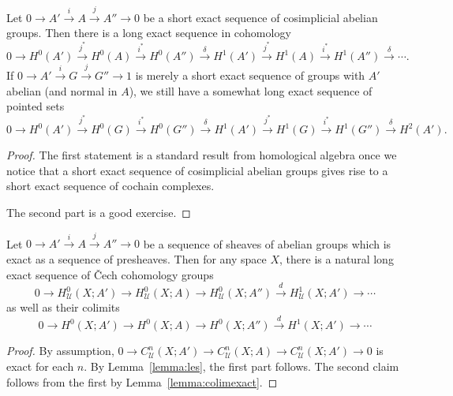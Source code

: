 \documentclass[a4paper,openany]{scrbook}
\begin{document}
\begin{lemma}\label{lemma:les}
Let $0 \to A' \xrightarrow{i} A \xrightarrow{j} A'' \to 0$ be a short exact sequence of cosimplicial abelian groups. Then there is a long exact sequence in cohomology
\[
0 \to H^0(A') \xrightarrow{j^*} H^0(A) \xrightarrow{i^*} H^0(A'') \xrightarrow{\delta} H^1(A') \xrightarrow{j^*} H^1(A) \xrightarrow{i^*} H^1(A'') \xrightarrow{\delta} \cdots.
\]
If $0 \to A' \xrightarrow{i} G \xrightarrow{j} G'' \to 1$ is merely a short exact sequence of groups with $A'$ abelian (and normal in $A$), we still have a somewhat long exact sequence of pointed sets
\[
0 \to H^0(A') \xrightarrow{j^*} H^0(G) \xrightarrow{i^*} H^0(G'') \xrightarrow{\delta} H^1(A') \xrightarrow{j^*} H^1(G) \xrightarrow{i^*} H^1(G'') \xrightarrow{\delta} H^2(A').
\]
\end{lemma}
\begin{proof}
The first statement is a standard result from homological algebra once we notice that a short exact sequence of cosimplicial abelian groups gives rise to a short exact sequence of cochain complexes.

The second part is a good exercise.
\end{proof}

\begin{corollary} \label{cor:lesfromsesofsheaves}
Let $0 \to A' \xrightarrow{i} A \xrightarrow{j} A'' \to 0$ be a sequence of sheaves of abelian groups which is exact as a sequence of presheaves. 
Then for any space $X$, there is a natural long exact sequence of Čech cohomology groups
\[
0 \to H^0_{\mathcal U}(X;A') \to H^0_{\mathcal U}(X;A) \to H^0_{\mathcal U}(X;A'') \xrightarrow{d} H^1_{\mathcal U}(X;A') \to \cdots
\]
as well as their colimits
\[
0 \to H^0(X;A') \to H^0(X;A) \to H^0(X;A'') \xrightarrow{d} H^1(X;A') \to \cdots
\]
\end{corollary}
\begin{proof}
By assumption, $0 \to C^n_{\mathcal U}(X;A') \to C^n_{\mathcal U}(X;A) \to C^n_{\mathcal U}(X;A') \to 0$ is exact for each $n$. By Lemma~\ref{lemma:les}, the first part follows. The second claim follows from the first by Lemma~\ref{lemma:colimexact}.
\end{proof}
\end{document}

